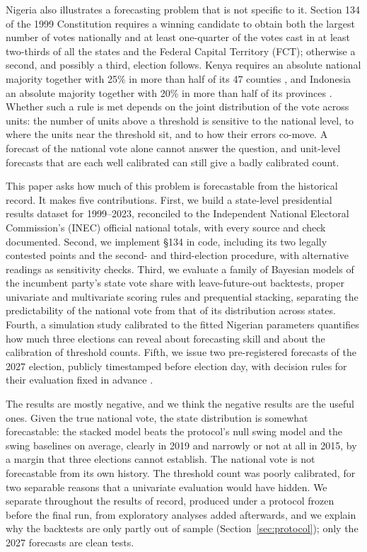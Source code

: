 \documentclass[preprint,12pt,authoryear]{elsarticle}
\begin{document}
Nigeria also illustrates a forecasting problem that is not specific to it. Section 134 of the 1999 Constitution \citep{Constitution1999} requires a winning candidate to obtain both the largest number of votes nationally and at least one-quarter of the votes cast in at least two-thirds of all the states and the Federal Capital Territory (FCT); otherwise a second, and possibly a third, election follows. Kenya requires an absolute national majority together with 25\% in more than half of its 47 counties \citep{KenyaConstitution2010}, and Indonesia an absolute majority together with 20\% in more than half of its provinces \citep{IndonesiaConstitution1945}. Whether such a rule is met depends on the joint distribution of the vote across units: the number of units above a threshold is sensitive to the national level, to where the units near the threshold sit, and to how their errors co-move. A forecast of the national vote alone cannot answer the question, and unit-level forecasts that are each well calibrated can still give a badly calibrated count.

This paper asks how much of this problem is forecastable from the historical record. It makes five contributions. First, we build a state-level presidential results dataset for 1999--2023, reconciled to the Independent National Electoral Commission's (INEC) official national totals, with every source and check documented. Second, we implement \S134 in code, including its two legally contested points and the second- and third-election procedure, with alternative readings as sensitivity checks. Third, we evaluate a family of Bayesian models of the incumbent party's state vote share with leave-future-out backtests, proper univariate and multivariate scoring rules and prequential stacking, separating the predictability of the national vote from that of its distribution across states. Fourth, a simulation study calibrated to the fitted Nigerian parameters quantifies how much three elections can reveal about forecasting skill and about the calibration of threshold counts. Fifth, we issue two pre-registered forecasts of the 2027 election, publicly timestamped before election day, with decision rules for their evaluation fixed in advance \citep{Monogan2015ResearchPreregistration}.

The results are mostly negative, and we think the negative results are the useful ones. Given the true national vote, the state distribution is somewhat forecastable: the stacked model beats the protocol's null swing model and the swing baselines on average, clearly in 2019 and narrowly or not at all in 2015, by a margin that three elections cannot establish. The national vote is not forecastable from its own history. The threshold count was poorly calibrated, for two separable reasons that a univariate evaluation would have hidden. We separate throughout the results of record, produced under a protocol frozen before the final run, from exploratory analyses added afterwards, and we explain why the backtests are only partly out of sample (Section~\ref{sec:protocol}); only the 2027 forecasts are clean tests.
\end{document}
